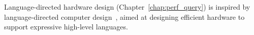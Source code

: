  Language-directed hardware design (Chapter~\ref{chap:perf_query})
is inspired by language-directed computer design~\cite{language-directed-computer-design,
ditzel_patterson, soar}, aimed at designing efficient hardware to support
expressive high-level languages.


